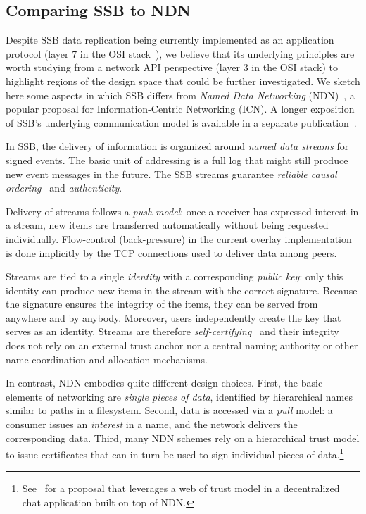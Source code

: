 \documentclass[9pt,sigconf]{acmart}
\begin{document}
\subsection*{Comparing SSB to NDN}

Despite SSB data replication being currently implemented as an
application protocol (layer 7 in the OSI
stack~\cite{briscoe2000understanding}), we believe that its underlying
principles are worth studying from a network API perspective (layer 3 in
the OSI stack) to highlight regions of the design space that could be
further investigated. We sketch here some aspects in which SSB differs
from \textit{Named Data Networking} (NDN)~\cite{ahlgren2012survey}, a
popular proposal for Information-Centric Networking (ICN). A longer
exposition of SSB's underlying communication model is available in a
separate publication~\cite{tschudin2019broadcast}.

In SSB, the delivery of information is organized around \textit{named
  data streams} for signed events. The basic unit of addressing is a
full log that might still produce new event messages in the future.
The SSB streams guarantee \textit{reliable causal
  ordering}~\cite{cachin2011introduction} and \textit{authenticity}.

Delivery of streams follows a \textit{push model}: once a receiver has expressed interest in a stream, new items are transferred automatically without being requested individually. Flow-control (back-pressure) in the current overlay implementation is done implicitly by the TCP connections used to deliver data among peers.

Streams are tied to a single \textit{identity} with a corresponding
\textit{public key}\/: only this identity can produce new items in the
stream with the correct signature.  Because the signature ensures the
integrity of the items, they can be served from anywhere and by
anybody.
Moreover, users independently create the key that serves as an
identity. Streams are therefore
\textit{self-certifying}~\cite{mazieres1998selfcertifyingpathnames}
and their integrity does not rely on an external trust anchor nor a
central naming authority or other name coordination and allocation
mechanisms.

In contrast, NDN embodies quite different design choices. First, the basic elements of networking are \textit{single pieces of data}, identified by hierarchical names similar to paths in a filesystem. Second, data is accessed via a \textit{pull} model: a consumer issues an \textit{interest} in a name, and the network delivers the corresponding data. Third, many NDN schemes rely on a hierarchical trust model to issue certificates that can in turn be used to sign individual pieces of data.\footnote{See~\cite{zhu2012chronos} for a proposal that leverages a web of trust model in a decentralized chat application built on top of NDN.}
\end{document}
